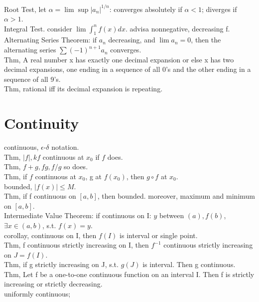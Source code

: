 \documentclass[paper=a4, fontsize=11pt]{scrartcl} %
\numberwithin{equation}{section} %
\numberwithin{figure}{section} %
\numberwithin{table}{section} %
\begin{document}
Root Test, let $\alpha = \lim\sup |a_n|^{1/n}$: converges absolutely if $\alpha<1$; diverges if $\alpha >1$.\\
Integral Test.
consider $\lim \int_1^n f(x)dx$. advisa nonnegative, decreasing f.\\
Alternating Series Theorem: if $a_n$ decreasing, and $\lim a_n=0$, then the alternating series $\sum (-1)^{n+1} a_n$ converges.\\
Thm, A real number x has exactly one decimal expansion or else x has two decimal expansions, one ending in a sequence of all 0's and the other ending in a sequence of all 9's.\\
Thm, rational iff its decimal expansion is repeating.

\section{Continuity}
continuous, $\epsilon$-$\delta$ notation.\\
Thm, $|f|,kf$ continuous at $x_0$ if $f$ does.\\
Thm, $f+g, fg, f/g$ so does.\\
Thm, if $f$ continuous at $x_0$, g at $f(x_0)$, then $g\circ f$ at $x_0$.\\
bounded, $|f(x)|\leq M$.\\
Thm, if f continuous on $[a,b]$, then bounded. moreover, maximum and minimum on $[a,b]$.\\
Intermediate Value Theorem: if continuous on I: $y$ between $(a),f(b)$, $\exists x\in(a,b)$, s.t. $f(x)=y$.\\
corollay, continuous on I, then $f(I)$ is interval or single point.\\
Thm, f continuous strictly increasing on I, then $f^{-1}$ continuous strictly increasing on $J=f(I)$.\\
Thm, if g strictly increasing on J, s.t. $g(J)$ is interval. Then g continuous.\\
Thm, Let f be a one-to-one continuous function on an interval I. Then f is strictly increasing or strictly decreasing.\\
uniformly continuous;\\
\end{document}
